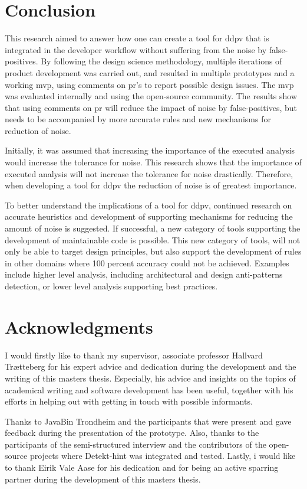 \documentclass{report}
\begin{document}
\section{Conclusion}
\label{conclusion}


This research aimed to answer how one can create a tool for \gls{ddpv} that is integrated in the developer workflow without suffering from the noise by false-positives. By following the design science methodology, multiple iterations of product development was carried out, and resulted in multiple prototypes and a working \gls{mvp}, using comments on \gls{pr}'s to report possible design issues. The \gls{mvp} was evaluated internally and using the open-source community. The results show that using comments on \gls{pr} will reduce the impact of noise by false-positives, but needs to be accompanied by more accurate rules and new mechanisms for reduction of noise. 

Initially, it was assumed that increasing the importance of the executed analysis would increase the tolerance for noise. This research shows that the importance of executed analysis will not increase the tolerance for noise drastically. Therefore, when developing a tool for \gls{ddpv} the reduction of noise is of greatest importance. 

To better understand the implications of a tool for \gls{ddpv}, continued research on accurate heuristics and development of supporting mechanisms for reducing the amount of noise is suggested. If successful, a new category of tools supporting the development of maintainable code is possible. This new category of tools, will not only be able to target design principles, but also support the development of rules in other domains where 100 percent accuracy could not be achieved. Examples include higher level analysis, including architectural and design anti-patterns detection, or lower level analysis supporting best practices.

\section{Acknowledgments}
\label{acknowledgements}
I would firstly like to thank my supervisor, associate professor Hallvard Trætteberg for his expert advice and dedication during the development and the writing of this masters thesis. Especially, his advice and insights on the topics of academical writing and software development has been useful, together with his efforts in helping out with getting in touch with possible informants.

Thanks to JavaBin Trondheim and the participants that were present and gave feedback during the presentation of the prototype. Also, thanks to the participants of the semi-structured interview and the contributors of the open-source projects where Detekt-hint was integrated and tested. Lastly, i would like to thank Eirik Vale Aase for his dedication and for being an active sparring partner during the development of this masters thesis.

\printbibliography

\appendix
\label{appendix}

\end{document}
